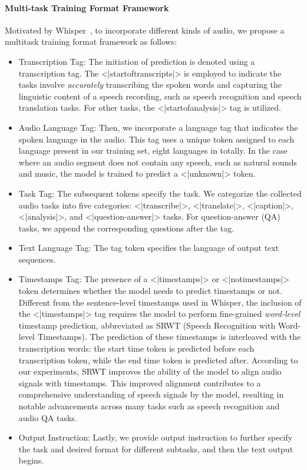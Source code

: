 \documentclass{article}
\begin{document}
 
\paragraph{Multi-task Training Format Framework} Motivated by Whisper~\citep{Whisper}, to incorporate different kinds of audio, we propose a multitask training format framework as follows: 
\begin{itemize}
    \item Transcription Tag: The initiation of prediction is denoted using a transcription tag. The <|startoftranscripts|> is employed to indicate the tasks involve \textit{accurately} transcribing the spoken words and capturing the linguistic content of a speech recording, such as speech recognition and speech translation tasks. For other tasks, the <|startofanalysis|> tag is utilized.
    \item Audio Language Tag: Then, we incorporate a language tag that indicates the spoken language in the audio. This tag uses a unique token assigned to each language present in our training set, eight languages in totally. In the case where an audio segment does not contain any speech, such as natural sounds and music, the model is trained to predict a <|unknown|> token.
    \item Task Tag: The subsequent tokens specify the task. We categorize the collected audio tasks into five categories: <|transcribe|>, <|translate|>, <|caption|>, <|analysis|>, and <|question-answer|> tasks. For question-answer (QA) tasks, we append the corresponding questions after the tag.
    \item Text Language Tag: The tag token specifies the language of output text sequences.
    \item Timestamps Tag: The presence of a <|timestamps|> or <|notimestamps|> token determines whether the model needs to predict timestamps or not. Different from the sentence-level timestamps used in Whisper, the inclusion of the <|timestamps|> tag requires the model to perform fine-grained \textit{word-level} timestamp prediction, abbreviated as SRWT (Speech Recognition with Word-level Timestamps). The prediction of these timestamps is interleaved with the transcription words: the start time token is predicted before each transcription token, while the end time token is predicted after. According to our experiments, SRWT improves the ability of the model to align audio signals with timestamps. This improved alignment contributes to a comprehensive understanding of speech signals by the model, resulting in notable advancements across many tasks such as speech recognition and audio QA tasks.
    \item Output Instruction: Lastly, we provide output instruction to further specify the task and desired format for different subtasks, and then the text output begins.
\end{itemize}
\end{document}
